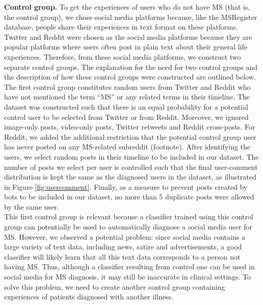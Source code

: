 \documentclass[11pt,a4paper]{article}
\begin{document}
\indent \textbf{Control group.} To get the experiences of users who do not have MS (that is, the control group), we chose social media platforms because, like the MSRegister database, people share their experiences in text format on these platforms. Twitter and Reddit were chosen as the social media platforms because they are popular platforms where users often post in plain text about their general life experiences. Therefore, from these social media platforms, we construct two separate control groups. The explanation for the need for two control groups and the description of how these control groups were constructed are outlined below. \\
\indent The first control group constitutes random users from Twitter and Reddit who have not mentioned the term “MS” or any related terms in their timeline. The dataset was constructed such that there is an equal probability for a potential control user to be selected from Twitter or from Reddit. Moreover, we ignored image-only posts, video-only posts, Twitter retweets and Reddit cross-posts. For Reddit, we added the additional restriction that the potential control group user has never posted on any MS-related subreddit (footnote). After identifying the users, we select random posts in their timeline to be included in our dataset. The number of posts we select per user is controlled such that the final user-comment distribution is kept the same as the diagnosed users in the dataset, as illustrated in Figure \ref{fig:usercomment}. Finally, as a measure to prevent posts created by bots to be included in our dataset, no more than 5 duplicate posts were allowed by the same user. \\
\indent This first control group is relevant because a classifier trained using this control group can potentially be used to automatically diagnose a social media user for MS. However, we observed a potential problem: since social media contains a large variety of text data, including news, satire and advertisements, a good classifier will likely learn that all this text data corresponds to a person not having MS. Thus, although a classifier resulting from control one can be used in social media for MS diagnosis, it may still be inaccurate in clinical settings. To solve this problem, we need to create another control group containing experiences of patients diagnosed with another illness. \\
\end{document}
